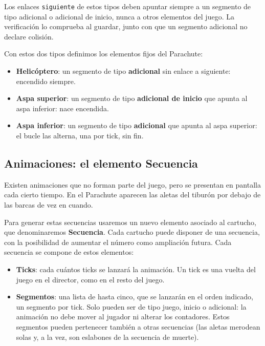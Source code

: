 Los enlaces \texttt{siguiente} de estos tipos deben apuntar siempre a un segmento de tipo adicional o adicional de inicio, nunca a otros elementos del juego. La verificación lo comprueba al guardar, junto con que un segmento adicional no declare colisión.

Con estos dos tipos definimos los elementos fijos del Parachute:

\begin{itemize}
	\item \textbf{Helicóptero}: un segmento de tipo \textbf{adicional} sin enlace a siguiente: encendido siempre.
	
	\item \textbf{Aspa superior}: un segmento de tipo \textbf{adicional de inicio} que apunta al aspa inferior: nace encendida.
	
	\item \textbf{Aspa inferior}: un segmento de tipo \textbf{adicional} que apunta al aspa superior: el bucle las alterna, una por tick, sin fin.
\end{itemize}

\subsection{Animaciones: el elemento Secuencia}

Existen animaciones que no forman parte del juego, pero se presentan en pantalla cada cierto tiempo. En el Parachute aparecen las aletas del tiburón por debajo de las barcas de vez en cuando.

Para generar estas secuencias usaremos un nuevo elemento asociado al cartucho, que denominaremos \textbf{Secuencia}. Cada cartucho puede disponer de una secuencia, con la posibilidad de aumentar el número como ampliación futura. Cada secuencia se compone de estos elementos:

\begin{itemize}
	\item \textbf{Ticks}: cada cuántos ticks se lanzará la animación. Un tick es una vuelta del juego en el director, como en el resto del juego.
	
	\item \textbf{Segmentos}: una lista de hasta cinco, que se lanzarán en el orden indicado, un segmento por tick. Solo pueden ser de tipo juego, inicio o adicional: la animación no debe mover al jugador ni alterar los contadores. Estos segmentos pueden pertenecer también a otras secuencias (las aletas merodean solas y, a la vez, son eslabones de la secuencia de muerte).
\end{itemize}

